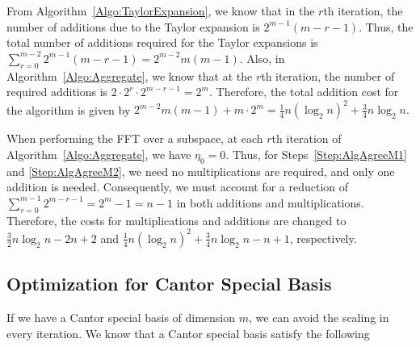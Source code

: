 From Algorithm~\ref{Algo:TaylorExpansion}, we know that in the $r$th iteration, the number of additions due to the Taylor expansion is $2^{m-1}(m-r-1)$. Thus, the total number of additions required for the Taylor expansions is $\sum_{r=0}^{m-2}2^{m-1}(m-r-1) = 2^{m-2}m(m-1)$. Also, in Algorithm~\ref{Algo:Aggregate}, we know that at the $r$th iteration, the number of required additions is $2 \cdot 2^r \cdot 2^{m-r-1} =2^{m}$. Therefore, the total addition cost for the algorithm is given by
\(2^{m-2}m(m-1) + m\cdot 2^m= \frac{1}{4}n(\log_2n)^2 + \frac{3}{4}n\log_2n. \)

When performing the FFT over a subspace, at each $r$th iteration of Algorithm~\ref{Algo:Aggregate}, we have $\eta_0=0$. Thus, for Steps~\ref{Step:AlgAgreeM1} and \ref{Step:AlgAgreeM2}, we need no multiplications are required, and only one addition is needed. Consequently, we must account for a reduction of $\sum_{r=0}^{m-1} 2^{m-r-1}=2^m-1=n-1$ in both additions and multiplications. Therefore, the costs for multiplications and additions are changed to
$\frac{3}{2} n \log_2 n -2n +2$ and  $\frac{1}{4}n(\log_2n)^2 + \frac{3}{4}n\log_2n-n+1$, respectively.

\subsection{Optimization for Cantor Special Basis}\label{Sec:Gao-optimization-Cantor_basis}

If we have a Cantor special basis of dimension $m$, we can avoid the scaling in every iteration. We know that a Cantor special basis satisfy the following

